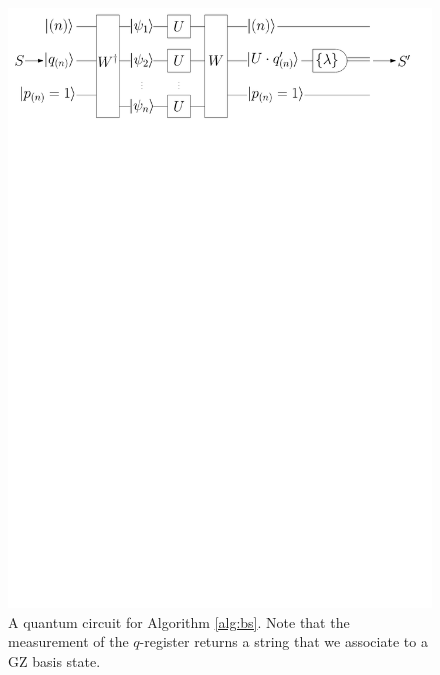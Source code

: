 \begin{figure}
\includegraphics[width=\linewidth]{noisy_circuit/noiseless_circuit_irrep}
\caption[A quantum circuit for Algorithm \ref{alg:bs}]{
A quantum circuit for Algorithm \ref{alg:bs}. 
Note that the measurement of the $q$-register returns a string that we associate to a GZ basis state.}
\label{fig:bs}
\end{figure}

